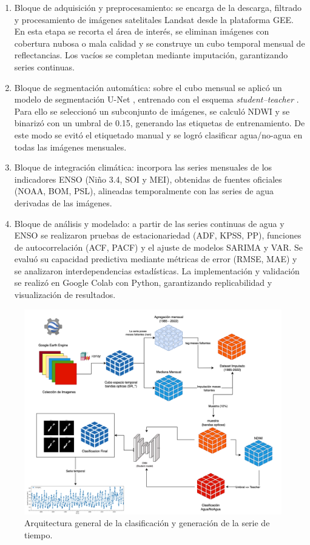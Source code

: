 \begin{enumerate}
    \item Bloque de adquisición y preprocesamiento: se encarga de la descarga, filtrado y procesamiento de imágenes satelitales Landsat desde la plataforma GEE. En esta etapa se recorta el área de interés, se eliminan imágenes con cobertura nubosa o mala calidad y se construye un cubo temporal mensual de reflectancias. Los vacíos se completan mediante imputación, garantizando series continuas.

    \item Bloque de segmentación automática: sobre el cubo mensual se aplicó un modelo de segmentación U-Net \citep{ronneberger2015unet}, entrenado con el esquema \textit{student–teacher} \citep{hinton2015distilling}. Para ello se seleccionó un subconjunto de imágenes, se calculó NDWI y se binarizó con un umbral de 0.15, generando las etiquetas de entrenamiento. De este modo se evitó el etiquetado manual y se logró clasificar agua/no-agua en todas las imágenes mensuales.

    \item Bloque de integración climática: incorpora las series mensuales de los indicadores ENSO (Niño 3.4, SOI y MEI), obtenidas de fuentes oficiales (NOAA, BOM, PSL), alineadas temporalmente con las series de agua derivadas de las imágenes.

    \item Bloque de análisis y modelado: a partir de las series continuas de agua y ENSO se realizaron pruebas de estacionariedad (ADF, KPSS, PP), funciones de autocorrelación (ACF, PACF) y el ajuste de modelos SARIMA y VAR. Se evaluó su capacidad predictiva mediante métricas de error (RMSE, MAE) y se analizaron interdependencias estadísticas. La implementación y validación se realizó en Google Colab con Python, garantizando replicabilidad y visualización de resultados.
\end{enumerate}


\begin{figure}
	\centering
	\includegraphics[scale=.4]{Figures/Arqui_TTFB22.png}
	\caption{Arquitectura general de la clasificación y generación de la serie de tiempo.}
	\label{fig:arquitectura_general}
\end{figure}

